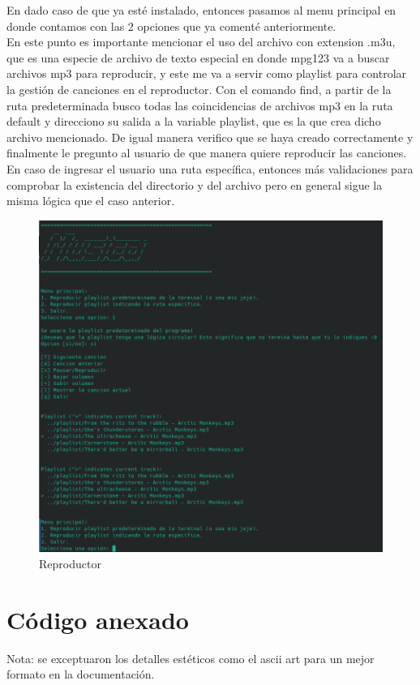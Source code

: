 \documentclass[letter,11pt]{article}
\begin{document}
En dado caso de que ya esté instalado, entonces pasamos al menu principal en donde contamos con las 2 opciones que ya comenté anteriormente. \\
En este punto es importante mencionar el uso del archivo con extension .m3u, que es una especie de archivo de texto especial en donde mpg123 va a buscar archivos mp3 para reproducir, y este me va a servir como playlist para controlar la gestión de canciones en el reproductor. Con el comando find, a partir de la ruta predeterminada busco todas las coincidencias de archivos mp3 en la ruta default y direcciono su salida a la variable playlist, que es la que crea dicho archivo mencionado. De igual manera verifico que se haya creado correctamente y finalmente le pregunto al usuario de que manera quiere reproducir las canciones.\\
En caso de ingresar el usuario una ruta específica, entonces más validaciones para comprobar la existencia del directorio y del archivo pero en general sigue la misma lógica que el caso anterior.

\begin{figure} [H]
    \centering 
    \caption{Reproductor}
    \includegraphics[scale=.6]{musica1.png} 
\end{figure}


\newpage
\section{Código anexado}
Nota: se exceptuaron los detalles estéticos como el ascii art para un mejor formato en la documentación.
\end{document}
